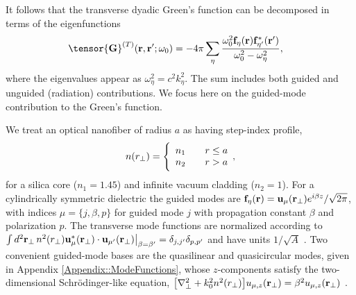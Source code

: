 \documentclass[preprint,aps,pra,onecolumn]{revtex4-1} %
\newcommand{\fidx}{\eta}
\newcommand{\eigenf}{\mbf{f}_\fidx}
\newcommand{\eigenfp}{\mbf{f}_{\fidx'}}
\begin{document}
It follows that the transverse dyadic Green's function can be decomposed in terms of the eigenfunctions~\cite{sakoda_optical_1996, sondergaard_general_2001}
	\begin{align}
		\tensor{\mathbf{G}}^{(T)}(\br,\br'; \omega_0)%
	&= -4\pi \sum_{\fidx} \frac{  \omega_0^2 \eigenf (\br) 
\eigenfp^* (\br')}{\omega_0^2-\omega_\fidx^2},
	\end{align}
where the eigenvalues appear as $\omega_\fidx^2 = c^2 k_\fidx^2$.  The sum includes both guided and unguided (radiation) contributions. We focus here on the guided-mode contribution to the Green's function. 

We treat an optical nanofiber of radius $a$ as having step-index profile,
	\begin{align} \label{Eq::IndexofRefraction}
		n(r_\perp) = \Bigg\{  
			\begin{array}{l l} n_1 & \quad r \leq a \\
						 n_2 & \quad r > a 
		\end{array},
	\end{align}
for a silica core ($n_1 = 1.45$) and infinite vacuum cladding ($n_2 = 1$).  For a cylindrically symmetric dielectric the guided modes are $\eigenf (\br) = \mathbf{u}_\mu (\br_\perp) e^{i\beta z}/\sqrt{2 \pi}$, with indices $\mu=\{j, \beta, p\}$ for guided mode $j$ with propagation constant $\beta$ and polarization $p$.  The transverse mode functions are normalized according to $\int d^2 \mathbf{r}_\perp \, n^2(r_\perp)\mathbf{u}^*_\mu (\mathbf{r}_\perp) \cdot \mathbf{u}_{\mu'} (\mathbf{r}_\perp)\big|_{\beta = \beta'} = \delta_{j,j'}\delta_{p,p'}$ and have units $1/\sqrt{A}$ \cite{le_kien_anisotropy_2014}.  Two convenient guided-mode bases are the quasilinear and quasicircular modes, given in  Appendix \ref{Appendix::ModeFunctions}, whose $z$-components satisfy the two-dimensional Schr\"{o}dinger-like equation, $\big[\nabla_\perp^2 +k_0^2 n^2(r_\perp) \big] u_{\mu,z} (\mathbf{r}_\perp) = \beta^2 u_{\mu,z} (\mathbf{r}_\perp)$ \cite{kien_field_2004}.  
\end{document}
